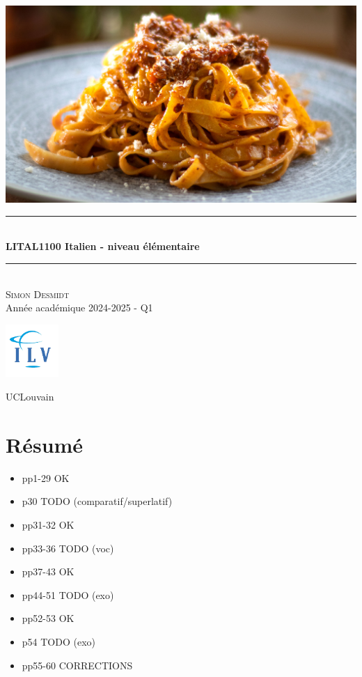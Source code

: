 \documentclass[12pt, openany]{report}
\newcommand{\HRule}{\rule{\linewidth}{0.5mm}}
\begin{document}
\begin{titlepage}
    \begin{sffamily}
    \begin{center}
        \includegraphics[scale=0.25]{img/page_de_garde.png} \\[1cm]
        \HRule \\[0.4cm]
        { \huge \bfseries LITAL1100 Italien - niveau élémentaire \\[0.4cm] }
    
        \HRule \\[1.5cm]
        \textsc{\LARGE Simon Desmidt}\\[1cm]
        \vfill
        \vspace{2cm}
        {\large Année académique 2024-2025 - Q1}
        \vspace{0.4cm}
         
        \includegraphics[width=0.15\textwidth]{img/ilv.png}
        
        UCLouvain\\
    
    \end{center}
    \end{sffamily}
\end{titlepage}

\setcounter{tocdepth}{1}
\tableofcontents
\chapter{Résumé}
\begin{itemize}
    \item pp1-29 OK
    \item p30 TODO (comparatif/superlatif)
    \item pp31-32 OK
    \item pp33-36 TODO (voc)
    \item pp37-43 OK 
    \item pp44-51 TODO (exo)
    \item pp52-53 OK
    \item p54 TODO (exo)
    \item pp55-60 CORRECTIONS
\end{itemize}
\end{document}
